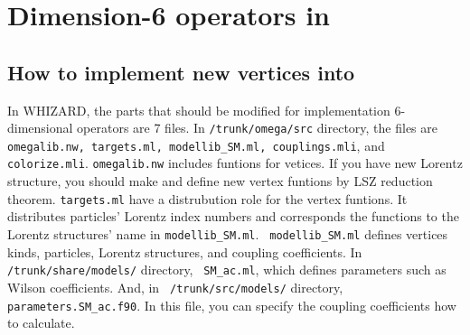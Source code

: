 %
%
%
%

\chapter{Dimension-6 operators in \whizard}
\label{app:notation}

\section{How to implement new vertices into \whizard}



In WHIZARD, the parts that should be modified for implementation 6-dimensional operators are 7 files.
In \texttt{/trunk/omega/src} directory, the files are \texttt{omegalib.nw, targets.ml, modellib\_SM.ml, couplings.mli}, and 
\texttt{colorize.mli}. \texttt{omegalib.nw} includes funtions for vetices. 
If you have new Lorentz structure, you should make and
define new vertex funtions by LSZ reduction theorem. 
\texttt{targets.ml} have a distrubution role for the vertex funtions. 
It distributes particles' Lorentz index numbers and corresponds the functions
to the Lorentz structures' name in \texttt{modellib\_SM.ml}. 
\texttt{ modellib\_SM.ml} defines vertices kinds, particles, Lorentz structures, and coupling coefficients.
In \texttt{/trunk/share/models/} directory, \texttt{ SM\_ac.ml}, 
which defines parameters such as Wilson coefficients.
And, in \texttt{ /trunk/src/models/} directory, \texttt{parameters.SM\_ac.f90}. 
In this file, you can specify the coupling coefficients how to calculate. 

